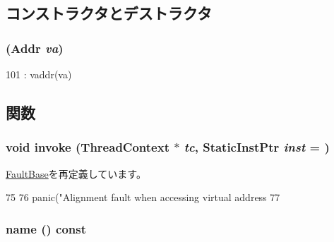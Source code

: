 \subsection{コンストラクタとデストラクタ}
\hypertarget{classGenericAlignmentFault_ae92105b81024d8f266cfb1b08fbbe35f}{
\subsubsection[{GenericAlignmentFault}]{ ({\bf Addr} {\em va})}}
\label{classGenericAlignmentFault_ae92105b81024d8f266cfb1b08fbbe35f}



\begin{DoxyCode}
101 : vaddr(va) {}
\end{DoxyCode}


\subsection{関数}
\hypertarget{classGenericAlignmentFault_a2bd783b42262278d41157d428e1f8d6f}{
\subsubsection[{invoke}]{\setlength{\rightskip}{0pt plus 5cm}void invoke ({\bf ThreadContext} $\ast$ {\em tc}, \/  {\bf StaticInstPtr} {\em inst} = {})}}
\label{classGenericAlignmentFault_a2bd783b42262278d41157d428e1f8d6f}


\hyperlink{classFaultBase_a2bd783b42262278d41157d428e1f8d6f}{FaultBase}を再定義しています。


\begin{DoxyCode}
75 {
76     panic("Alignment fault when accessing virtual address %
77 }
\end{DoxyCode}
\hypertarget{classGenericAlignmentFault_a73adb23259baf912a81683a9790a303f}{
\subsubsection[{name}]{ name () const}}
\label{classGenericAlignmentFault_a73adb23259baf912a81683a9790a303f}



